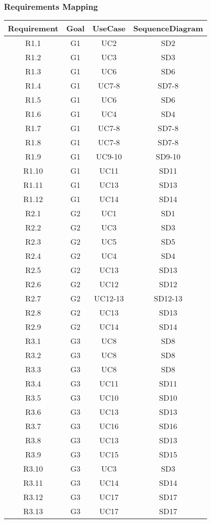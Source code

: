 \subsubsection{Requirements Mapping}

	\setlength{\tabcolsep}{1cm}
\begin{longtable}[]{c c c c}
	\textbf{Requirement} & \textbf{Goal} & \textbf{UseCase} & \textbf{SequenceDiagram} \\
	\hline   
	\endhead
	R1.1 & G1 & UC2 & SD2 \\
	R1.2 & G1 & UC3 & SD3 \\
	R1.3 & G1 & UC6 & SD6 \\
	R1.4 & G1 & UC7-8 & SD7-8\\
	R1.5 & G1 & UC6 & SD6 \\
	R1.6 & G1 & UC4 & SD4 \\
	R1.7 & G1 & UC7-8 & SD7-8\\
	R1.8 & G1 & UC7-8 & SD7-8\\
	R1.9 & G1 & UC9-10 & SD9-10\\
	R1.10 & G1 & UC11 & SD11\\
	R1.11 & G1 & UC13 & SD13\\
	R1.12 & G1 & UC14 & SD14\\
	
	R2.1 & G2 & UC1 & SD1 \\
	R2.2 & G2 & UC3 & SD3 \\
	R2.3 & G2 & UC5 & SD5 \\
	R2.4 & G2 & UC4 & SD4 \\
	R2.5 & G2 & UC13 & SD13 \\
	R2.6 & G2 & UC12 & SD12 \\
	R2.7 & G2 & UC12-13 & SD12-13 \\
	R2.8 & G2 & UC13 & SD13 \\
	R2.9 & G2 & UC14 & SD14\\

	R3.1 & G3 & UC8 & SD8 \\
	R3.2 & G3 & UC8 & SD8 \\
	R3.3 & G3 & UC8 & SD8 \\
	R3.4 & G3 & UC11 & SD11 \\
	R3.5 & G3 & UC10 & SD10 \\
	R3.6 & G3 & UC13 & SD13 \\
	R3.7 & G3 & UC16 & SD16\\
	R3.8 & G3 & UC13 & SD13\\
	R3.9 & G3 & UC15 & SD15\\
	R3.10 & G3 & UC3 & SD3 \\
	R3.11 & G3 & UC14 & SD14\\
	R3.12 & G3 & UC17 & SD17\\
	R3.13 & G3 & UC17 & SD17\\

	
	
\end{longtable}

